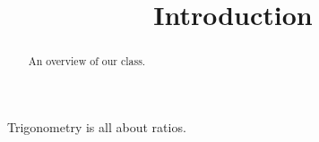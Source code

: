 \documentclass{ximera}
\title{Introduction}
\begin{document}
\begin{abstract}
An overview of our class.
\end{abstract}
\maketitle

Trigonometry is all about ratios.
\end{document}
